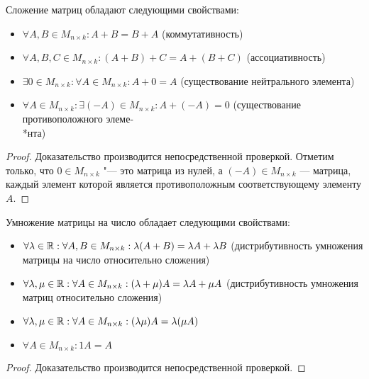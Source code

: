     \begin{proposition}
    	Сложение матриц обладают следующими свойствами:
    	
    	\begin{itemize}
    		\item $\forall A, B \in M_{n \times k}: A + B = B + A$ (коммутативность)
    		\item $\forall A, B, C \in M_{n \times k}: (A + B) + C = A + (B + C)$ (ассоциативность)
    		\item $\exists 0 \in M_{n \times k}: \forall A \in M_{n \times k}: A+0 = A$ (существование нейтрального элемента)
    		\item $\forall A \in M_{n \times k}: \exists (-A) \in M_{n \times k}: A+(-A) = 0$ (существование противоположного элеме-\\*нта)
    	\end{itemize}
    \end{proposition}
    
    \begin{proof}
    	Доказательство производится непосредственной проверкой. Отметим только, что $0 \in M_{n \times k}$ "--- это матрица из нулей, а $(-A) \in M_{n \times k}$ --- матрица, каждый элемент которой является противоположным соответствующему элементу $A$.
    \end{proof}
    
    \begin{proposition}
    	Умножение матрицы на число обладает следующими свойствами:
    	
    	\begin{itemize}
    		\item $\forall \lambda \in \mathbb{R}: \forall A, B \in M_{n \times k}: \lambda(A + B) = \lambda A + \lambda B$ (дистрибутивность умножения матрицы на число относительно сложения)
    		\item $\forall \lambda, \mu \in \mathbb{R}: \forall A \in M_{n \times k}: (\lambda + \mu)A = \lambda A + \mu A$ (дистрибутивность умножения матриц относительно сложения)
    		\item $\forall \lambda, \mu \in \mathbb{R}: \forall A \in M_{n \times k}: (\lambda \mu)A = \lambda (\mu A)$
    		\item $\forall A \in M_{n \times k}: 1A = A$
    	\end{itemize}
    \end{proposition}
    
    \begin{proof}
    	Доказательство производится непосредственной проверкой.
    \end{proof}
    
